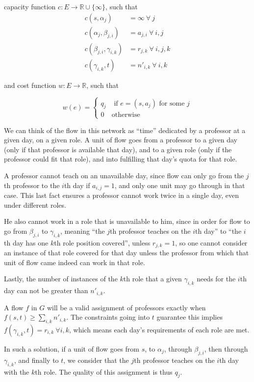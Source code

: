 capacity function $c:E \to \mathbb{R} \cup \{\infty\}$, such that
\begin{align*}
c(s, \alpha_j) &= \infty\ \forall\ j\\
c(\alpha_j, \beta_{j, i}) &= a_{j, i}\ \forall\ i, j\\
c(\beta_{j, i}, \gamma_{i, k}) &= r_{j, k}\ \forall\ i, j, k\\
c(\gamma_{i, k}, t) &= n'_{i, k}\ \forall\ i, k
\end{align*}

and cost function $w:E \to \mathbb{R}$, such that

$$
w(e) =
\begin{cases}
q_j &\text{ if } e = (s, a_j) \text{ for some }j\\
0 & \text{otherwise}
\end{cases}
$$

We can think of the flow in this network as ``time'' dedicated by a professor at a given day, on a given role. A unit of flow goes from a professor to a given day (only if that professor is available that day), and to a given role (only if the professor could fit that role), and into fulfilling that day's quota for that role.

A professor cannot teach on an unavailable day, since flow can only go from the $j$th professor to the $i$th day if $a_{i, j} = 1$, and only one unit may go through in that case. This last fact ensures a professor cannot work twice in a single day, even under different roles.

He also cannot work in a role that is unavailable to him, since in order for flow to go from $\beta_{j, i}$ to $\gamma_{i, k}$, meaning ``the $j$th professor teaches on the $i$th day'' to ``the $i$th day has one $k$th role position covered'', unless $r_{j, k} = 1$, so one cannot consider an instance of that role covered for that day unless the professor from which that unit of flow came indeed can work in that role.

Lastly, the number of instances of the $k$th role that a given $\gamma_{i, k}$ needs for the $i$th day can not be greater than $n'_{i, k}$.

A flow $f$ in $G$ will be a valid assignment of professors exactly when $f(s, t) \ge \sum_{i, k} n'_{i, k}$. The constraints going into $t$ guarantee this implies $f(\gamma_{i, k}, t) = r_{i, k}\ \forall i, k$, which means each day's requirements of each role are met.

In such a solution, if a unit of flow goes from $s$, to $\alpha_j$, through $\beta_{j, i}$, then through $\gamma_{i, k}$, and finally to $t$, we consider that the $j$th professor teaches on the $i$th day with the $k$th role. The quality of this assignment is thus $q_j$.

